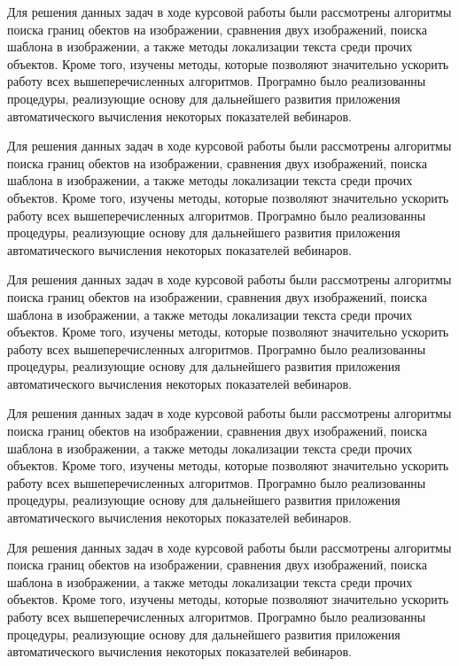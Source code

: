 \documentclass[oneside,final,14pt]{extreport}
\begin{document}
	Для решения данных задач в ходе курсовой работы были рассмотрены алгоритмы поиска границ обектов на изображении, сравнения двух изображений, поиска шаблона в изображении, а также методы локализации текста среди прочих объектов. Кроме того, изучены методы, которые позволяют значительно ускорить работу всех вышеперечисленных алгоритмов. Програмно было реализованны процедуры, реализующие основу для дальнейшего развития приложения автоматического вычисления некоторых показателей вебинаров. 


	Для решения данных задач в ходе курсовой работы были рассмотрены алгоритмы поиска границ обектов на изображении, сравнения двух изображений, поиска шаблона в изображении, а также методы локализации текста среди прочих объектов. Кроме того, изучены методы, которые позволяют значительно ускорить работу всех вышеперечисленных алгоритмов. Програмно было реализованны процедуры, реализующие основу для дальнейшего развития приложения автоматического вычисления некоторых показателей вебинаров. 


	Для решения данных задач в ходе курсовой работы были рассмотрены алгоритмы поиска границ обектов на изображении, сравнения двух изображений, поиска шаблона в изображении, а также методы локализации текста среди прочих объектов. Кроме того, изучены методы, которые позволяют значительно ускорить работу всех вышеперечисленных алгоритмов. Програмно было реализованны процедуры, реализующие основу для дальнейшего развития приложения автоматического вычисления некоторых показателей вебинаров. 


	Для решения данных задач в ходе курсовой работы были рассмотрены алгоритмы поиска границ обектов на изображении, сравнения двух изображений, поиска шаблона в изображении, а также методы локализации текста среди прочих объектов. Кроме того, изучены методы, которые позволяют значительно ускорить работу всех вышеперечисленных алгоритмов. Програмно было реализованны процедуры, реализующие основу для дальнейшего развития приложения автоматического вычисления некоторых показателей вебинаров. 


	Для решения данных задач в ходе курсовой работы были рассмотрены алгоритмы поиска границ обектов на изображении, сравнения двух изображений, поиска шаблона в изображении, а также методы локализации текста среди прочих объектов. Кроме того, изучены методы, которые позволяют значительно ускорить работу всех вышеперечисленных алгоритмов. Програмно было реализованны процедуры, реализующие основу для дальнейшего развития приложения автоматического вычисления некоторых показателей вебинаров. 
\end{document}
